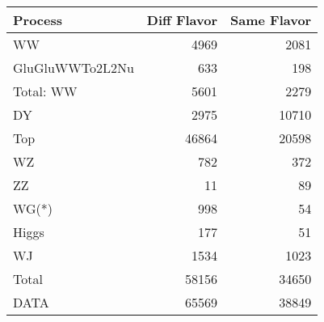 \begin{table}[ht]
	\centering
\begin{tabular}{lrr}

         Process &  Diff Flavor &  Same Flavor \\
		\hline
              WW &         4969 &         2081 \\
 GluGluWWTo2L2Nu &          633 &          198 \\
\hline
       Total: WW &         5601 &         2279 \\
              DY &         2975 &        10710 \\
             Top &        46864 &        20598 \\
              WZ &          782 &          372 \\
              ZZ &           11 &           89 \\
           WG(*) &          998 &           54 \\
           Higgs &          177 &           51 \\
              WJ &         1534 &         1023 \\
\hline
           Total &        58156 &        34650 \\
            DATA &        65569 &        38849 \\


\end{tabular}

\end{table}